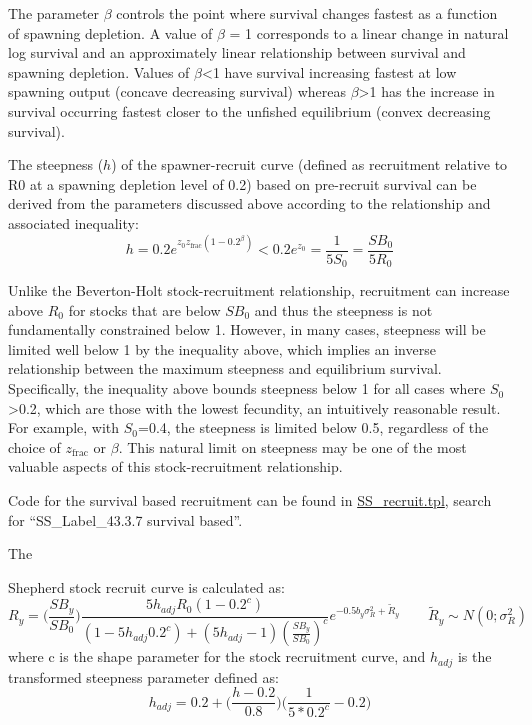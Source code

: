 The parameter $\beta$ controls the point where survival changes fastest as a function of spawning depletion. A value of $\beta$ = 1 corresponds to a linear change in natural log survival and an approximately linear relationship between survival and spawning depletion. Values of $\beta$<1 have survival increasing fastest at low spawning output (concave decreasing survival) whereas $\beta$>1 has the increase in survival occurring fastest closer to the unfished equilibrium (convex decreasing survival).

The steepness ($h$) of the spawner-recruit curve (defined as recruitment relative to R0 at a spawning depletion level of 0.2) based on pre-recruit survival can be derived from the parameters discussed above according to the relationship and associated inequality:
\begin{equation}
h = 0.2e^{z_0z_{\text{frac}}(1-0.2^\beta)}<0.2e^{z_0}=\frac{1}{5S_0}=\frac{SB_0}{5R_0}
\end{equation}

Unlike the Beverton-Holt stock-recruitment relationship, recruitment can increase above $R_0$ for stocks that are below $SB_0$ and thus the steepness is not fundamentally constrained below 1. However, in many cases, steepness will be limited well below 1 by the inequality above, which implies an inverse relationship between the maximum steepness and equilibrium survival. Specifically, the inequality above bounds steepness below 1 for all cases where $S_0$>0.2, which are those with the lowest fecundity, an intuitively reasonable result. For example, with $S_0$=0.4, the steepness is limited below 0.5, regardless of the choice of $z_{\text{frac}}$ or $\beta$. This natural limit on steepness may be one of the most valuable aspects of this stock-recruitment relationship.

Code for the survival based recruitment can be found in \href{https://github.com/nmfs-ost/ss3-source-code/blob/main/SS_recruit.tpl}{SS\_recruit.tpl}, search for ``SS\_Label\_43.3.7 survival based''.

\hypertarget{Shepherd}{The} Shepherd stock recruit curve is calculated as:
\begin{equation}
R_y = \bigg(\frac{SB_y}{SB_0}\bigg)\frac{5h_{adj}R_0(1-0.2^c)}{(1-5h_{adj}0.2^c)+(5h_{adj}-1)(\frac{SB_y}{SB_0})^c}e^{-0.5b_y\sigma^2_R+\tilde{R}_y}\qquad \tilde{R}_y\sim N(0;\sigma^2_R)
\end{equation}
where c is the shape parameter for the stock recruitment curve, and $h_{adj}$ is the transformed steepness parameter defined as:
\begin{equation}
h_{adj}=0.2+\bigg(\frac{h-0.2}{0.8}\bigg)\bigg(\frac{1}{5*0.2^c}-0.2\bigg)
\end{equation}

